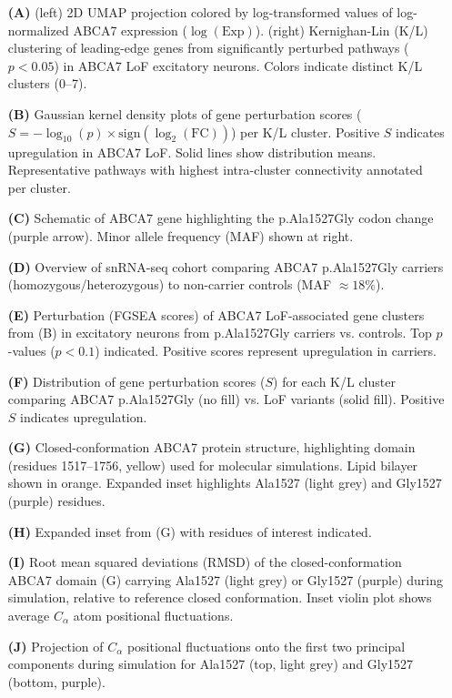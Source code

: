 \begin{itemize}
    \item[\textbf{(A)}] (left) 2D UMAP projection colored by log-transformed values of log-normalized ABCA7 expression ($\log(\text{Exp})$). (right) Kernighan-Lin (K/L) clustering of leading-edge genes from significantly perturbed pathways ($p<0.05$) in ABCA7 LoF excitatory neurons. Colors indicate distinct K/L clusters (0–7).
    \item[\textbf{(B)}] Gaussian kernel density plots of gene perturbation scores ($S=-\log_{10}(p)\times\text{sign}(\log_2(\text{FC}))$) per K/L cluster. Positive $S$ indicates upregulation in ABCA7 LoF. Solid lines show distribution means. Representative pathways with highest intra-cluster connectivity annotated per cluster.
    \item[\textbf{(C)}] Schematic of ABCA7 gene highlighting the p.Ala1527Gly codon change (purple arrow). Minor allele frequency (MAF) shown at right.
    \item[\textbf{(D)}] Overview of snRNA-seq cohort comparing ABCA7 p.Ala1527Gly carriers (homozygous/heterozygous) to non-carrier controls (MAF $\approx18\%$).
    \item[\textbf{(E)}] Perturbation (FGSEA scores) of ABCA7 LoF-associated gene clusters from (B) in excitatory neurons from p.Ala1527Gly carriers vs. controls. Top $p$-values ($p<0.1$) indicated. Positive scores represent upregulation in carriers.
    \item[\textbf{(F)}] Distribution of gene perturbation scores ($S$) for each K/L cluster comparing ABCA7 p.Ala1527Gly (no fill) vs. LoF variants (solid fill). Positive $S$ indicates upregulation.
    \item[\textbf{(G)}] Closed-conformation ABCA7 protein structure, highlighting domain (residues 1517–1756, yellow) used for molecular simulations. Lipid bilayer shown in orange. Expanded inset highlights Ala1527 (light grey) and Gly1527 (purple) residues.
    \item[\textbf{(H)}] Expanded inset from (G) with residues of interest indicated.
    \item[\textbf{(I)}] Root mean squared deviations (RMSD) of the closed-conformation ABCA7 domain (G) carrying Ala1527 (light grey) or Gly1527 (purple) during simulation, relative to reference closed conformation. Inset violin plot shows average $C_\alpha$ atom positional fluctuations.
    \item[\textbf{(J)}] Projection of $C_\alpha$ positional fluctuations onto the first two principal components during simulation for Ala1527 (top, light grey) and Gly1527 (bottom, purple).
\end{itemize}